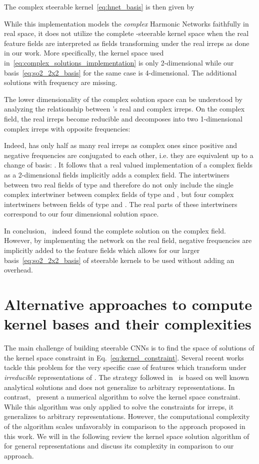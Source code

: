 \documentclass{article}
\begin{document}
{{The complex steerable kernel~\eqref{eq:hnet_basis} is then given by

While this implementation models the \textit{complex} Harmonic Networks faithfully in real space, it does not utilize the complete -steerable kernel space when the real feature fields are interpreted as fields transforming under the real irreps  as done in our work.
More specifically, the kernel space used in~\eqref{eq:complex_solutions_implementation} is only 2-dimensional while our basis~\eqref{eq:so2_2x2_basis} for the same case is 4-dimensional.
The additional solutions with frequency  are missing.

The lower dimensionality of the complex solution space can be understood by analyzing the relationship between 's real and complex irreps.
On the complex field, the real irreps become reducible and decomposes into two 1-dimensional complex irreps with opposite frequencies:

Indeed,  has only half as many real irreps as complex ones since positive and negative frequencies are conjugated to each other, i.e. they are equivalent up to a change of basis: .
It follows that a real valued implementation of a complex  fields as a 2-dimensional  fields implicitly adds a complex  field.
The intertwiners between two real fields of type  and  therefore do not only include the single complex intertwiner between complex fields of type  and , but four complex intertwiners between fields of type  and .
The real parts of these intertwiners correspond to our four dimensional solution space.

In conclusion,~\cite{Worrall2017-HNET} indeed found the complete solution on the complex field.
However, by implementing the network on the real field, negative frequencies are implicitly added to the feature fields which allows for our larger basis~\eqref{eq:so2_2x2_basis} of steerable kernels to be used without adding an overhead.

  	
\section{Alternative approaches to compute kernel bases and their complexities}
\label{apx:comparison_SE3Nets}

The main challenge of building steerable CNNs is to find the space of solutions of the kernel space constraint in Eq.~\ref{eq:kernel_constraint}.
Several recent works tackle this problem for the very specific case of features which transform under \textit{irreducible} representations of .
The strategy followed in~\cite{TensorFieldNets,Kondor2018-NBN,kondorClebschGordanNets2018,anderson2019cormorant} is based on well known analytical solutions and does not generalize to arbitrary representations.
In contrast,~\cite{3d_steerableCNNs} present a numerical algorithm to solve the kernel space constraint.
While this algorithm was only applied to solve the constraints for irreps, it generalizes to arbitrary representations.
However, the computational complexity of the algorithm scales unfavorably in comparison to the approach proposed in this work.
We will in the following review the kernel space solution algorithm of~\cite{3d_steerableCNNs} for general representations and discuss its complexity in comparison to our approach.

}}
\end{document}
